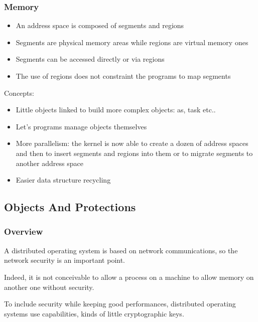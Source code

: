 \documentclass[8pt]{beamer}
\newcommand{\nl}[0]{\vspace{0.4cm}}
\begin{document}
\begin{frame}
  \frametitle{Memory}

  \begin{itemize}[<+->]
    \item
      An address space is composed of segments and regions
    \item
      Segments are physical memory areas while regions are virtual memory
      ones
    \item
      Segments can be accessed directly or via regions
    \item
      The use of regions does not constraint the programs to map
      segments
  \end{itemize}

  \nl

  Concepts:

  \begin{itemize}[<+->]
    \item
      Little objects linked to build more complex objects:
      as, task etc..
    \item
      Let's programs manage objects themselves
    \item
      More parallelism: the kernel is now able to create a dozen
      of address spaces and then to insert segments and regions
      into them or to migrate segments to another address space
    \item
      Easier data structure recycling
  \end{itemize}
\end{frame}

%
%

\subsection{Objects And Protections}


\begin{frame}
  \frametitle{Overview}

  A distributed operating system is based on network communications, so
  the network security is an important point.

  \nl

  Indeed, it is not conceivable to allow a process on a machine
  to allow memory on another one without security.

  \nl

  To include security while keeping good performances, distributed
  operating systems use capabilities, kinds of little cryptographic keys.
\end{frame}
\end{document}
